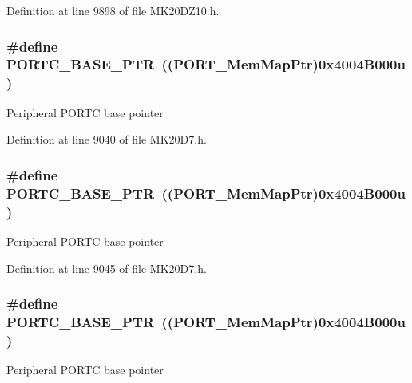 Definition at line 9898 of file M\+K20\+D\+Z10.\+h.

\subsubsection[{\texorpdfstring{P\+O\+R\+T\+C\+\_\+\+B\+A\+S\+E\+\_\+\+P\+TR}{PORTC_BASE_PTR}}]{\setlength{\rightskip}{0pt plus 5cm}\#define P\+O\+R\+T\+C\+\_\+\+B\+A\+S\+E\+\_\+\+P\+TR~(({\bf P\+O\+R\+T\+\_\+\+Mem\+Map\+Ptr})0x4004\+B000u)}\hypertarget{group___p_o_r_t___peripheral_ga03c740cdda17711afafc932723871474}{}\label{group___p_o_r_t___peripheral_ga03c740cdda17711afafc932723871474}
Peripheral P\+O\+R\+TC base pointer 

Definition at line 9040 of file M\+K20\+D7.\+h.

\subsubsection[{\texorpdfstring{P\+O\+R\+T\+C\+\_\+\+B\+A\+S\+E\+\_\+\+P\+TR}{PORTC_BASE_PTR}}]{\setlength{\rightskip}{0pt plus 5cm}\#define P\+O\+R\+T\+C\+\_\+\+B\+A\+S\+E\+\_\+\+P\+TR~(({\bf P\+O\+R\+T\+\_\+\+Mem\+Map\+Ptr})0x4004\+B000u)}\hypertarget{group___p_o_r_t___peripheral_ga03c740cdda17711afafc932723871474}{}\label{group___p_o_r_t___peripheral_ga03c740cdda17711afafc932723871474}
Peripheral P\+O\+R\+TC base pointer 

Definition at line 9045 of file M\+K20\+D7.\+h.

\subsubsection[{\texorpdfstring{P\+O\+R\+T\+C\+\_\+\+B\+A\+S\+E\+\_\+\+P\+TR}{PORTC_BASE_PTR}}]{\setlength{\rightskip}{0pt plus 5cm}\#define P\+O\+R\+T\+C\+\_\+\+B\+A\+S\+E\+\_\+\+P\+TR~(({\bf P\+O\+R\+T\+\_\+\+Mem\+Map\+Ptr})0x4004\+B000u)}\hypertarget{group___p_o_r_t___peripheral_ga03c740cdda17711afafc932723871474}{}\label{group___p_o_r_t___peripheral_ga03c740cdda17711afafc932723871474}
Peripheral P\+O\+R\+TC base pointer 

